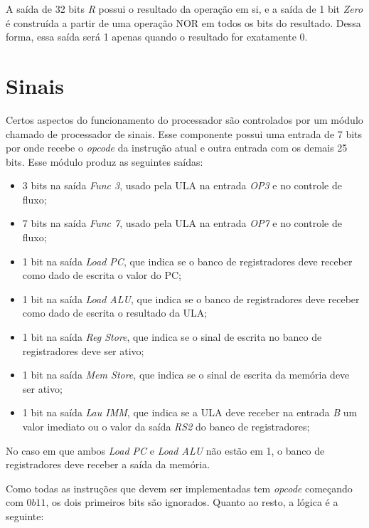\documentclass[twocolumn]{article}
\newcommand{\circuit}[1]{}
\begin{document}
A saída de 32 bits \textit{R} possui o resultado da operação em si, e a saída de
1 bit \textit{Zero} é construída a partir de uma operação NOR em todos os bits
do resultado. Dessa forma, essa saída será 1 apenas quando o resultado for
exatamente 0.

\section{Sinais} \label{sinais}

Certos aspectos do funcionamento do processador são controlados por um módulo
chamado de processador de sinais. Esse componente possui uma entrada de 7 bits
por onde recebe o \textit{opcode} da instrução atual e outra entrada com os
demais 25 bits. Esse módulo produz as seguintes saídas:

\circuit{signal-proc}

\begin{itemize}
\item 3 bits na saída \textit{Func 3}, usado pela ULA na entrada \textit{OP3} e
  no controle de fluxo;
\item 7 bits na saída \textit{Func 7}, usado pela ULA na entrada \textit{OP7} e
  no controle de fluxo;
\item 1 bit na saída \textit{Load PC}, que indica se o banco de registradores
  deve receber como dado de escrita o valor do PC;
\item 1 bit na saída \textit{Load ALU}, que indica se o banco de registradores
  deve receber como dado de escrita o resultado da ULA;
\item 1 bit na saída \textit{Reg Store}, que indica se o sinal de escrita no
  banco de registradores deve ser ativo;
\item 1 bit na saída \textit{Mem Store}, que indica se o sinal de escrita da
  memória deve ser ativo;
\item 1 bit na saída \textit{Lau IMM}, que indica se a ULA deve receber na
  entrada \textit{B} um valor imediato ou o valor da saída \textit{RS2} do banco
  de registradores;
\end{itemize}

No caso em que ambos \textit{Load PC} e \textit{Load ALU} não estão em 1, o
banco de registradores deve receber a saída da memória.

Como todas as instruções que devem ser implementadas tem \textit{opcode}
começando com $0b11$, os dois primeiros bits são ignorados. Quanto ao resto, a
lógica é a seguinte:
\end{document}

